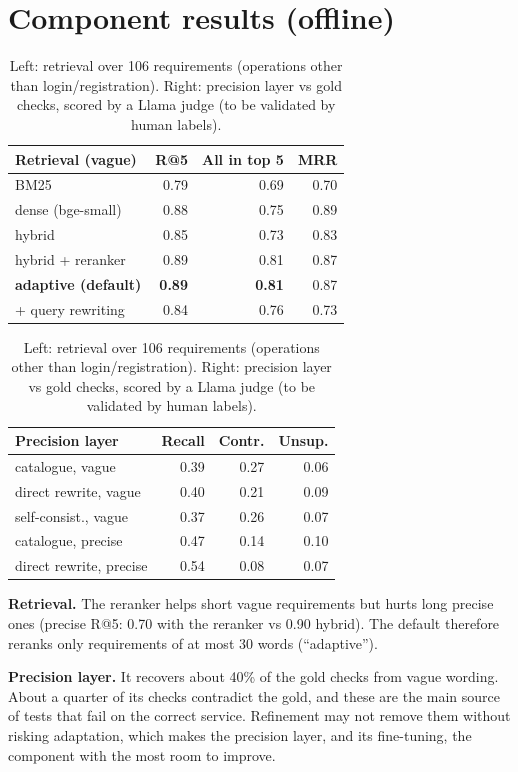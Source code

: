 \documentclass[11pt,a4paper]{article}
\begin{document}
\section{Component results (offline)}
\begin{table}[H]\centering\small
\begin{minipage}[t]{0.48\linewidth}\centering\setlength{\tabcolsep}{4pt}
\begin{tabular}{lrrr}\toprule
Retrieval (vague) & R@5 & All in top 5 & MRR\\\midrule
BM25 & 0.79 & 0.69 & 0.70\\
dense (bge-small) & 0.88 & 0.75 & 0.89\\
hybrid & 0.85 & 0.73 & 0.83\\
hybrid + reranker & 0.89 & 0.81 & 0.87\\
\textbf{adaptive (default)} & \textbf{0.89} & \textbf{0.81} & 0.87\\
+ query rewriting & 0.84 & 0.76 & 0.73\\
\bottomrule\end{tabular}
\end{minipage}\hfill
\begin{minipage}[t]{0.48\linewidth}\centering\setlength{\tabcolsep}{4pt}
\begin{tabular}{lrrr}\toprule
Precision layer & Recall & Contr. & Unsup.\\\midrule
catalogue, vague & 0.39 & 0.27 & 0.06\\
direct rewrite, vague & 0.40 & 0.21 & 0.09\\
self-consist., vague & 0.37 & 0.26 & 0.07\\
catalogue, precise & 0.47 & 0.14 & 0.10\\
direct rewrite, precise & 0.54 & 0.08 & 0.07\\
\bottomrule\end{tabular}
\end{minipage}
\caption{Left: retrieval over 106 requirements (operations other than login/registration). Right: precision layer vs gold checks, scored by a Llama judge (to be validated by human labels).}
\end{table}
\textbf{Retrieval.} The reranker helps short vague requirements but hurts long precise ones (precise R@5: 0.70 with the reranker vs 0.90 hybrid). The default therefore reranks only requirements of at most 30 words (``adaptive'').

\textbf{Precision layer.} It recovers about 40\% of the gold checks from vague wording. About a quarter of its checks contradict the gold, and these are the main source of tests that fail on the correct service. Refinement may not remove them without risking adaptation, which makes the precision layer, and its fine-tuning, the component with the most room to improve.
\end{document}

